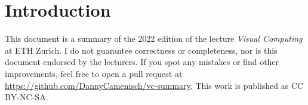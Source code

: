 \section{Introduction}

This document is a summary of the 2022 edition of the lecture \textit{Visual Computing} at ETH Zurich. I do not guarantee correctness or completeness, nor is this document endorsed by the lecturers. If you spot any mistakes or find other improvements, feel free to open a pull request at \url{https://github.com/DannyCamenisch/vc-summary}. This work is published as CC BY-NC-SA.
\begin{center}
	\ccbyncsa
\end{center}